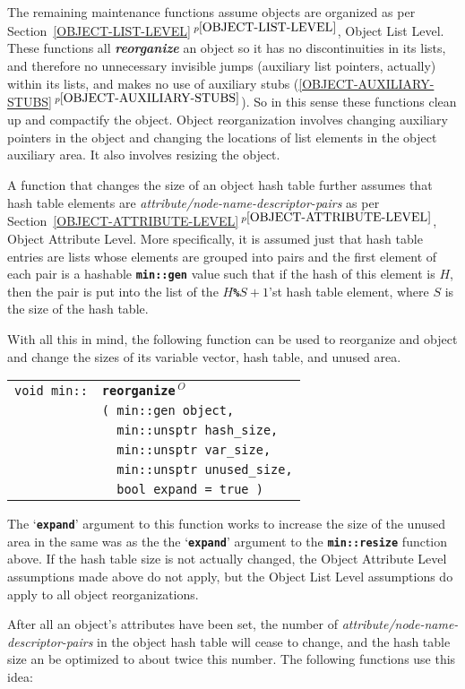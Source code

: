 \documentclass[12pt]{article}
\makeatletter
\newcommand{\TT}[1]{{\tt \bfseries #1}}
\newcommand{\ikey}[2]{{\bf \em #1}\index{#2}}
\newcommand{\ttindex}[1]{\index{#1@{\tt #1}}}
\newcommand{\itemref}[1]{\ref{#1}$\,^{p\pageref{#1}}$}
\newenvironment{indpar}[1][0.3in]%
	{\begin{list}{}%
		     {\setlength{\itemsep}{0in}%
		      \setlength{\topsep}{0in}%
		      \setlength{\parsep}{1ex}%
		      \setlength{\labelwidth}{#1}%
		      \setlength{\leftmargin}{#1}%
		      \addtolength{\leftmargin}{\labelsep}}%
	 \item}%
	{\end{list}}
\newcommand{\LABEL}[1]{\label{#1}}
\newlength{\ARGBREAKLENGTH}
\newcommand{\ARGBREAK}[1][\ARGBREAKLENGTH]{\\&\hspace*{#1}}
\newcommand{\MINKEY}[1]%
	   {\TT{#1}\ttindex{min::#1}\ttindex{#1}}
\newcommand{\REORG}{$\,^O$}
\makeatother
\begin{document}
The remaining maintenance functions assume objects are organized
as per Section~\itemref{OBJECT-LIST-LEVEL}, Object List Level.
These functions all \ikey{reorganize}{object}
an object so it has no discontinuities
in its lists, and therefore no unnecessary invisible jumps (auxiliary
list pointers, actually) within its lists, and makes no use of
auxiliary stubs (\itemref{OBJECT-AUXILIARY-STUBS}).  So in this
sense these functions clean up and compactify the object.  Object
reorganization involves changing auxiliary pointers in the object and
changing the locations of list elements in the object auxiliary area.
It also involves resizing the object.

A function that changes the size of an object hash table further
assumes that hash table elements are {\em attribute/node-name-descriptor-pairs}
as per Section~\itemref{OBJECT-ATTRIBUTE-LEVEL}, Object Attribute Level.
More specifically, it is assumed just that hash table entries are lists
whose elements are grouped into pairs and the first element of each
pair is a hashable \TT{min::gen} value such that if the hash of this
element is $H$, then the pair is put into the list of the $H$\TT{\%}$S+1$'st
hash table element, where $S$ is the size of the hash table.

With all this in mind, the following function can be used to
reorganize and object and change the sizes of its variable vector, hash table,
and unused area.

\begin{indpar}\begin{tabular}{r@{}l}
\verb|void min::| & \MINKEY{reorganize\REORG}\ARGBREAK
    \verb|( min::gen object,|\ARGBREAK
    \verb|  min::unsptr hash_size,|\ARGBREAK
    \verb|  min::unsptr var_size,|\ARGBREAK
    \verb|  min::unsptr unused_size,|\ARGBREAK
    \verb|  bool expand = true )|
\LABEL{MIN::REORGANIZE} \\
\end{tabular}\end{indpar}

The `\TT{expand}' argument to this function works to increase the
size of the unused area in the same was as the
the `\TT{expand}' argument to the \TT{min::resize} function above.
If the hash table size is not actually changed, the Object Attribute Level
assumptions made above do not apply, but the Object List Level assumptions
do apply to all object reorganizations.

After all an object's attributes have been set, the number of
{\em attribute/node-name-descriptor-pairs} in the object hash table
will cease to change, and the hash table size an be optimized
to about twice this number.  The following functions use this idea:
\end{document}
